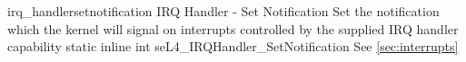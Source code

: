 %
%
%
%

\apidoc
{irq_handlersetnotification}
{IRQ Handler - Set Notification}
{Set the notification which the kernel will signal on interrupts
controlled by the supplied IRQ handler capability}
{static inline int seL4\_IRQHandler\_SetNotification}
{
}
{\errorenumdesc}
{See \autoref{sec:interrupts}}
